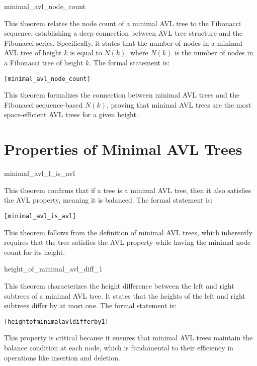     \begin{thm}{minimal\_avl\_node\_count}

    This theorem relates the node count of a minimal AVL tree to the Fibonacci sequence, establishing a deep connection between AVL tree structure and the Fibonacci series. Specifically, it states that the number of nodes in a minimal AVL tree of height \( k \) is equal to \( N(k) \), where \( N(k) \) is the number of nodes in a Fibonacci tree of height \( k \). The formal statement is:
    
    \begin{alltt}
    	[minimal_avl_node_count]
    \end{alltt}
    
    
    \end{thm}
    This theorem formalizes the connection between minimal AVL trees and the Fibonacci sequence-based \( N(k) \), proving that minimal AVL trees are the most space-efficient AVL trees for a given height.
    

\section{Properties of Minimal AVL Trees}
	
	\begin{thm}{minimal\_avl\_l\_is\_avl}

    This theorem confirms that if a tree is a minimal AVL tree, then it also satisfies the AVL property, meaning it is balanced. The formal statement is:

    \begin{alltt}
    	[minimal_avl_is_avl]
    \end{alltt}
    
    \end{thm}
    This theorem follows from the definition of minimal AVL trees, which inherently requires that the tree satisfies the AVL property while having the minimal node count for its height.


    \begin{thm}{height\_of\_minimal\_avl\_diff\_1}

    This theorem characterizes the height difference between the left and right subtrees of a minimal AVL tree. It states that the heights of the left and right subtrees differ by at most one. The formal statement is:
    
    \begin{alltt}
    	[height of minimal avl differ by 1]
    \end{alltt}
    
    
    \end{thm}
    This property is critical because it ensures that minimal AVL trees maintain the balance condition at each node, which is fundamental to their efficiency in operations like insertion and deletion.


